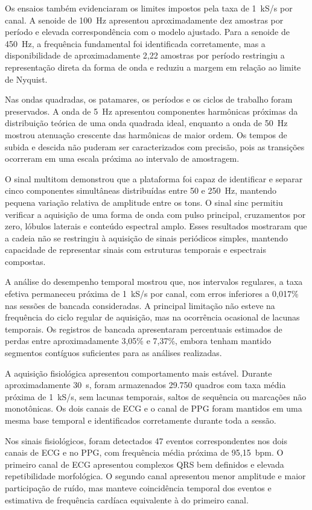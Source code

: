 \documentclass[a4paper,12pt]{fcte}
\begin{document}
Os ensaios também evidenciaram os limites impostos pela taxa de 1~kS/s por canal. A senoide de 100~Hz apresentou aproximadamente dez amostras por período e elevada correspondência com o modelo ajustado. Para a senoide de 450~Hz, a frequência fundamental foi identificada corretamente, mas a disponibilidade de aproximadamente 2,22 amostras por período restringiu a representação direta da forma de onda e reduziu a margem em relação ao limite de Nyquist.

Nas ondas quadradas, os patamares, os períodos e os ciclos de trabalho foram preservados. A onda de 5~Hz apresentou componentes harmônicas próximas da distribuição teórica de uma onda quadrada ideal, enquanto a onda de 50~Hz mostrou atenuação crescente das harmônicas de maior ordem. Os tempos de subida e descida não puderam ser caracterizados com precisão, pois as transições ocorreram em uma escala próxima ao intervalo de amostragem.

O sinal multitom demonstrou que a plataforma foi capaz de identificar e separar cinco componentes simultâneas distribuídas entre 50 e 250~Hz, mantendo pequena variação relativa de amplitude entre os tons. O sinal sinc permitiu verificar a aquisição de uma forma de onda com pulso principal, cruzamentos por zero, lóbulos laterais e conteúdo espectral amplo. Esses resultados mostraram que a cadeia não se restringiu à aquisição de sinais periódicos simples, mantendo capacidade de representar sinais com estruturas temporais e espectrais compostas.

A análise do desempenho temporal mostrou que, nos intervalos regulares, a taxa efetiva permaneceu próxima de 1~kS/s por canal, com erros inferiores a 0,017\% nas sessões de bancada consideradas. A principal limitação não esteve na frequência do ciclo regular de aquisição, mas na ocorrência ocasional de lacunas temporais. Os registros de bancada apresentaram percentuais estimados de perdas entre aproximadamente 3,05\% e 7,37\%, embora tenham mantido segmentos contíguos suficientes para as análises realizadas.

A aquisição fisiológica apresentou comportamento mais estável. Durante aproximadamente 30~s, foram armazenados 29.750 quadros com taxa média próxima de 1~kS/s, sem lacunas temporais, saltos de sequência ou marcações não monotônicas. Os dois canais de ECG e o canal de PPG foram mantidos em uma mesma base temporal e identificados corretamente durante toda a sessão.

Nos sinais fisiológicos, foram detectados 47 eventos correspondentes nos dois canais de ECG e no PPG, com frequência média próxima de 95,15~bpm. O primeiro canal de ECG apresentou complexos QRS bem definidos e elevada repetibilidade morfológica. O segundo canal apresentou menor amplitude e maior participação de ruído, mas manteve coincidência temporal dos eventos e estimativa de frequência cardíaca equivalente à do primeiro canal.
\end{document}
